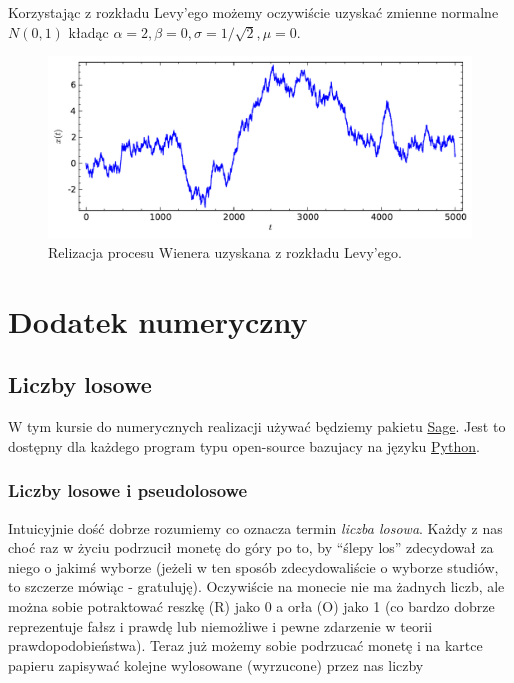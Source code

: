 \documentclass[a4paper,12pt,polish]{sphinxmanual}
\makeatletter
\renewenvironment{notice}[2]{\begin{icsebox}\def\py@noticetype{#1}\par\strong{#2}}{\end{icsebox}}\makeatother
\makeatother
\begin{document}
Korzystając z rozkładu Levy'ego możemy oczywiście uzyskać zmienne normalne
$N(0,1)$ kładąc $\alpha=2, \beta=0, \sigma = 1/\sqrt{2}, \mu=0$.
\begin{figure}[htbp]
\centering
\capstart

\includegraphics[width=0.800\linewidth]{sage_chIII02_04.pdf}
\caption{Relizacja procesu Wienera uzyskana z rozkładu Levy'ego.}\end{figure}


\chapter{Dodatek numeryczny}
\label{index:dodatek-numeryczny}

\section{Liczby losowe}
\label{ch5/chV011:liczby-losowe}\label{ch5/chV011::doc}
\begin{notice}{note}{Uwaga:}
W tym kursie do numerycznych realizacji używać będziemy pakietu \href{http://sagemath.org/}{Sage}. Jest to dostępny dla
każdego program typu open-source bazujacy na języku \href{http://python.org/}{Python}.
\end{notice}


\subsection{Liczby losowe i pseudolosowe}
\label{ch5/chV011:liczby-losowe-i-pseudolosowe}
Intuicyjnie dość dobrze rozumiemy co oznacza termin \emph{liczba losowa}. Każdy z nas choć
raz w życiu podrzucił monetę do góry po to, by ``ślepy los'' zdecydował za niego o jakimś
wyborze (jeżeli w ten sposób zdecydowaliście o wyborze studiów, to szczerze mówiąc -
gratuluję). Oczywiście na monecie nie ma żadnych liczb, ale można sobie potraktować
reszkę (R) jako 0 a orła (O) jako 1 (co bardzo dobrze reprezentuje fałsz i prawdę lub niemożliwe
i pewne zdarzenie w teorii prawdopodobieństwa). Teraz już możemy sobie podrzucać monetę
i na kartce papieru zapisywać kolejne wylosowane (wyrzucone) przez nas liczby
\end{document}
